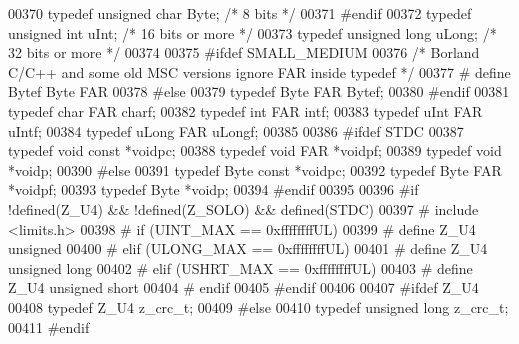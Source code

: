 \begin{DoxyCode}
00370 \textcolor{keyword}{typedef} \textcolor{keywordtype}{unsigned} \textcolor{keywordtype}{char}  Byte;  \textcolor{comment}{/* 8 bits */}
00371 \textcolor{preprocessor}{#endif}
00372 \textcolor{keyword}{typedef} \textcolor{keywordtype}{unsigned} \textcolor{keywordtype}{int}   uInt;  \textcolor{comment}{/* 16 bits or more */}
00373 \textcolor{keyword}{typedef} \textcolor{keywordtype}{unsigned} \textcolor{keywordtype}{long}  uLong; \textcolor{comment}{/* 32 bits or more */}
00374 
00375 \textcolor{preprocessor}{#ifdef SMALL\_MEDIUM}
00376    \textcolor{comment}{/* Borland C/C++ and some old MSC versions ignore FAR inside typedef */}
00377 \textcolor{preprocessor}{#  define Bytef Byte FAR}
00378 \textcolor{preprocessor}{#else}
00379    \textcolor{keyword}{typedef} Byte  FAR Bytef;
00380 \textcolor{preprocessor}{#endif}
00381 \textcolor{keyword}{typedef} \textcolor{keywordtype}{char}  FAR charf;
00382 \textcolor{keyword}{typedef} \textcolor{keywordtype}{int}   FAR intf;
00383 \textcolor{keyword}{typedef} uInt  FAR uIntf;
00384 \textcolor{keyword}{typedef} uLong FAR uLongf;
00385 
00386 \textcolor{preprocessor}{#ifdef STDC}
00387    \textcolor{keyword}{typedef} \textcolor{keywordtype}{void} \textcolor{keyword}{const} *voidpc;
00388    \textcolor{keyword}{typedef} \textcolor{keywordtype}{void} FAR   *voidpf;
00389    \textcolor{keyword}{typedef} \textcolor{keywordtype}{void}       *voidp;
00390 \textcolor{preprocessor}{#else}
00391    \textcolor{keyword}{typedef} Byte \textcolor{keyword}{const} *voidpc;
00392    \textcolor{keyword}{typedef} Byte FAR   *voidpf;
00393    \textcolor{keyword}{typedef} Byte       *voidp;
00394 \textcolor{preprocessor}{#endif}
00395 
00396 \textcolor{preprocessor}{#if !defined(Z\_U4) && !defined(Z\_SOLO) && defined(STDC)}
00397 \textcolor{preprocessor}{#  include <limits.h>}
00398 \textcolor{preprocessor}{#  if (UINT\_MAX == 0xffffffffUL)}
00399 \textcolor{preprocessor}{#    define Z\_U4 unsigned}
00400 \textcolor{preprocessor}{#  elif (ULONG\_MAX == 0xffffffffUL)}
00401 \textcolor{preprocessor}{#    define Z\_U4 unsigned long}
00402 \textcolor{preprocessor}{#  elif (USHRT\_MAX == 0xffffffffUL)}
00403 \textcolor{preprocessor}{#    define Z\_U4 unsigned short}
00404 \textcolor{preprocessor}{#  endif}
00405 \textcolor{preprocessor}{#endif}
00406 
00407 \textcolor{preprocessor}{#ifdef Z\_U4}
00408    \textcolor{keyword}{typedef} Z\_U4 z\_crc\_t;
00409 \textcolor{preprocessor}{#else}
00410    \textcolor{keyword}{typedef} \textcolor{keywordtype}{unsigned} \textcolor{keywordtype}{long} z\_crc\_t;
00411 \textcolor{preprocessor}{#endif}

\end{DoxyCode}
